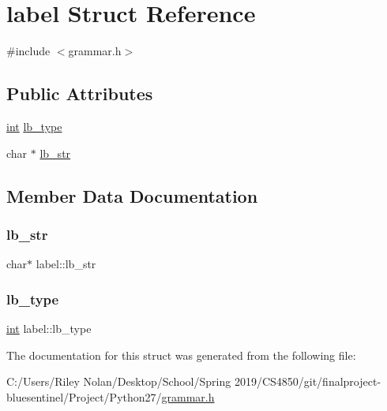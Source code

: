 \hypertarget{structlabel}{}\section{label Struct Reference}
\label{structlabel}


{\ttfamily \#include $<$grammar.\+h$>$}

\subsection*{Public Attributes}
\begin{DoxyCompactItemize}
\item 
\mbox{\hyperlink{warnings_8h_a74f207b5aa4ba51c3a2ad59b219a423b}{int}} \mbox{\hyperlink{structlabel_a63a37c929ae2356ee04dbca24c7b9150}{lb\+\_\+type}}
\item 
char $\ast$ \mbox{\hyperlink{structlabel_a072175e15ad32047ab018fd71b8ab13e}{lb\+\_\+str}}
\end{DoxyCompactItemize}


\subsection{Member Data Documentation}
\mbox{\label{structlabel_a072175e15ad32047ab018fd71b8ab13e}} 
\subsubsection{\texorpdfstring{lb\_str}{lb\_str}}
{\footnotesize\ttfamily char$\ast$ label\+::lb\+\_\+str}

\mbox{\label{structlabel_a63a37c929ae2356ee04dbca24c7b9150}} 
\subsubsection{\texorpdfstring{lb\_type}{lb\_type}}
{\footnotesize\ttfamily \mbox{\hyperlink{warnings_8h_a74f207b5aa4ba51c3a2ad59b219a423b}{int}} label\+::lb\+\_\+type}



The documentation for this struct was generated from the following file\+:\begin{DoxyCompactItemize}
\item 
C\+:/\+Users/\+Riley Nolan/\+Desktop/\+School/\+Spring 2019/\+C\+S4850/git/finalproject-\/bluesentinel/\+Project/\+Python27/\mbox{\hyperlink{grammar_8h}{grammar.\+h}}\end{DoxyCompactItemize}

